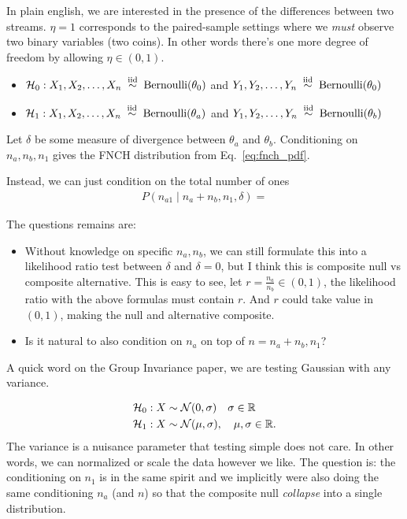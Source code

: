 In plain english, we are interested in the presence of the differences between two streams.
$\eta=1$ corresponds to the paired-sample settings where we \emph{must} observe two binary variables (two coins).
In other words there's one more degree of freedom by allowing $\eta\in(0,1)$.

\begin{itemize}
	\item $\mathcal{H}_0: X_1,X_2,\dots,X_n\; \overset{\mathrm{iid}}{\sim} \; \mathrm{Bernoulli}(\theta_0)$ and $Y_1,Y_2,\dots,Y_n\; \overset{\mathrm{iid}}{\sim} \; \mathrm{Bernoulli}(\theta_0)$
	\item $\mathcal{H}_1: X_1,X_2,\dots,X_n\; \overset{\mathrm{iid}}{\sim} \; \mathrm{Bernoulli}(\theta_a)$ and $Y_1,Y_2,\dots,Y_n\; \overset{\mathrm{iid}}{\sim} \; \mathrm{Bernoulli}(\theta_b)$
\end{itemize}

Let $\delta$ be some measure of divergence between $\theta_a$ and $\theta_b$.
Conditioning on $n_a,n_b,n_1$ gives the FNCH distribution
from Eq.~\ref{eq:fnch_pdf}.

Instead, we can just condition on the total number of ones
\begin{align*}
	P(n_{a1} \mid n_a+n_b,n_1,\delta) =
\end{align*}

The questions remains are:
\begin{itemize}
	\item Without knowledge on specific $n_a,n_b$,
	      we can still formulate this into a likelihood ratio test between $\delta$ and $\delta=0$,
	      but I think this is composite null vs composite alternative.
	      This is easy to see, let $r=\frac{n_a}{n_b}\in(0,1)$,
	      the likelihood ratio with the above formulas must contain $r$.
	      And $r$ could take value in $(0,1)$, making the null and alternative composite.
	\item Is it natural to also condition on $n_a$ on top of $n=n_a+n_b, n_1$?
\end{itemize}


A quick word on the Group Invariance paper, we are testing Gaussian with any variance.

\begin{align*}
	 & \Hc_0: X \sim \Nc(0, \sigma)  \quad \sigma \in \Rf         \\
	 & \Hc_1: X \sim \Nc(\mu, \sigma), \quad \mu, \sigma \in \Rf.
\end{align*}
The variance is a nuisance parameter that testing simple does not care.
In other words, we can normalized or scale the data however we like.
The question is: the conditioning on $n_1$ is in the same spirit
and we implicitly were also doing the same conditioning $n_a$ (and $n$)
so that the composite null \emph{collapse} into a single distribution.

